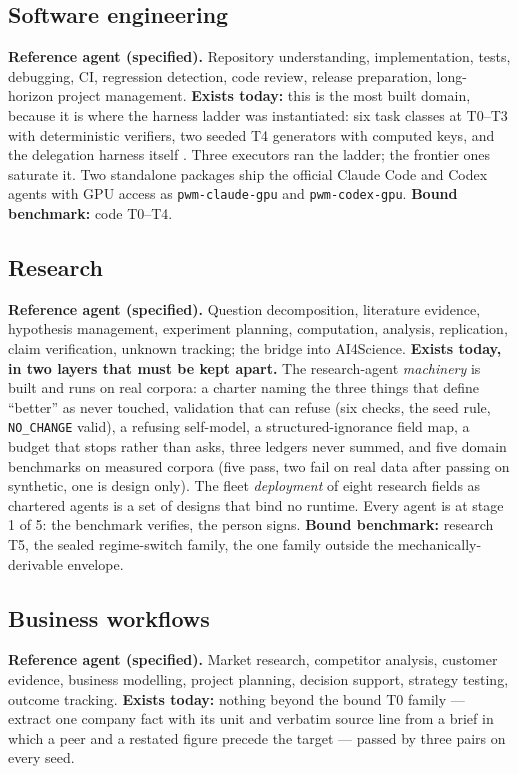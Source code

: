 \documentclass[11pt]{article}
\theoremstyle{definition}
\begin{document}
\subsection{Software engineering}

\textbf{Reference agent (specified).} Repository understanding, implementation, tests, debugging, CI, regression detection, code review, release preparation, long-horizon project management. \textbf{Exists today:} this is the most built domain, because it is where the harness ladder was instantiated: six task classes at T0--T3 with deterministic verifiers, two seeded T4 generators with computed keys, and the delegation harness itself \citep{yang2026harness}. Three executors ran the ladder; the frontier ones saturate it. Two standalone packages ship the official Claude Code and Codex agents with GPU access as \texttt{pwm-claude-gpu} and \texttt{pwm-codex-gpu}. \textbf{Bound benchmark:} code T0--T4.

\subsection{Research}

\textbf{Reference agent (specified).} Question decomposition, literature evidence, hypothesis management, experiment planning, computation, analysis, replication, claim verification, unknown tracking; the bridge into AI4Science. \textbf{Exists today, in two layers that must be kept apart.} The research-agent \emph{machinery} is built and runs on real corpora: a charter naming the three things that define ``better'' as never touched, validation that can refuse (six checks, the seed rule, \texttt{NO\_CHANGE} valid), a refusing self-model, a structured-ignorance field map, a budget that stops rather than asks, three ledgers never summed, and five domain benchmarks on measured corpora (five pass, two fail on real data after passing on synthetic, one is design only). The fleet \emph{deployment} of eight research fields as chartered agents is a set of designs that bind no runtime. Every agent is at stage 1 of 5: the benchmark verifies, the person signs. \textbf{Bound benchmark:} research T5, the sealed regime-switch family, the one family outside the mechanically-derivable envelope.

\subsection{Business workflows}

\textbf{Reference agent (specified).} Market research, competitor analysis, customer evidence, business modelling, project planning, decision support, strategy testing, outcome tracking. \textbf{Exists today:} nothing beyond the bound T0 family --- extract one company fact with its unit and verbatim source line from a brief in which a peer and a restated figure precede the target --- passed by three pairs on every seed.
\end{document}
